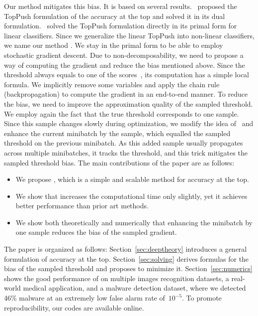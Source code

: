 Our method mitigates this bias. It is based on several results.~\cite{li2014top} proposed the TopPush formulation of the accuracy at the top and solved it in its dual formulation.~\cite{adam2021general} solved the TopPush formulation directly in its primal form for linear classifiers. Since we generalize the linear TopPush into non-linear classifiers, we name our method \DeepTopPush. We stay in the primal form to be able to employ stochastic gradient descent. Due to non-decomposability, we need to propose a way of computing the gradient and reduce the bias mentioned above. Since the threshold always equals to one of the scores~\cite{boyd2012accuracy}, its computation has a simple local formula. We implicitly remove some variables and apply the chain rule (backpropagation) to compute the gradient in an end-to-end manner. To reduce the bias, we need to improve the approximation quality of the sampled threshold. We employ again the fact that the true threshold corresponds to one sample. Since this sample changes slowly during optimization, we modify the idea of~\cite{adam2019machine} and enhance the current minibatch by the sample, which equalled the sampled threshold on the previous minibatch. As this added sample usually propagates across multiple minibatches, it tracks the threshold, and this trick mitigates the sampled threshold bias. The main contributions of the paper are as follows:
\begin{itemize}
  \item We propose \DeepTopPush, which is a simple and scalable method for accuracy at the top.
  \item We show that \DeepTopPush increases the computational time only slightly, yet it achieves better performance than prior art methods.
  \item We show both theoretically and numerically that enhancing the minibatch by one sample reduces the bias of the sampled gradient.
\end{itemize}
The paper is organized as follows: Section~\ref{sec:deeptheory} introduces a general formulation of accuracy at the top. Section~\ref{sec:solving} derives formulas for the bias of the sampled threshold and proposes \DeepTopPush to minimize it. Section~\ref{sec:numerics} shows the good performance of \DeepTopPush on multiple images recognition datasets, a real-world medical application, and a malware detection dataset, where we detected 46\% malware at an extremely low false alarm rate of~$10^{-5}$. To promote reproducibility, our codes are available online.

